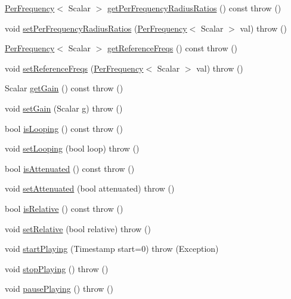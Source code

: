 \begin{DoxyCompactItemize}
\hyperlink{structAudio_1_1PerFrequency}{Per\+Frequency}$<$ Scalar $>$ \hyperlink{classAudio_1_1Source_a7af76debc465b08de34bcecb8e56a8b4}{get\+Per\+Frequency\+Radius\+Ratios} () const   throw ()
\item 
void \hyperlink{classAudio_1_1Source_ad6dd130e4af3ea5a7710928e0d542747}{set\+Per\+Frequency\+Radius\+Ratios} (\hyperlink{structAudio_1_1PerFrequency}{Per\+Frequency}$<$ Scalar $>$ val)  throw ()
\item 
\hyperlink{structAudio_1_1PerFrequency}{Per\+Frequency}$<$ Scalar $>$ \hyperlink{classAudio_1_1Source_a5358425f1485df421aa010b42b59f553}{get\+Reference\+Freqs} () const   throw ()
\item 
void \hyperlink{classAudio_1_1Source_a3455464edef39c958b987fe45ca78371}{set\+Reference\+Freqs} (\hyperlink{structAudio_1_1PerFrequency}{Per\+Frequency}$<$ Scalar $>$ val)  throw ()
\item 
Scalar \hyperlink{classAudio_1_1Source_adeaed3a4bbaaf6d60dd09e372d8e21e6}{get\+Gain} () const   throw ()
\item 
void \hyperlink{classAudio_1_1Source_a441db1be3a7072842e1a6643b65331d6}{set\+Gain} (Scalar g)  throw ()
\item 
bool \hyperlink{classAudio_1_1Source_aeafbb7052aea35fbfdbba9f81a4ebb2c}{is\+Looping} () const   throw ()
\item 
void \hyperlink{classAudio_1_1Source_a22dc52afab942aad5182511f6d669145}{set\+Looping} (bool loop)  throw ()
\item 
bool \hyperlink{classAudio_1_1Source_a62b43d5edb723e8297f5ad4878271175}{is\+Attenuated} () const   throw ()
\item 
void \hyperlink{classAudio_1_1Source_a55180fb909ec9950143b9b82e159a23a}{set\+Attenuated} (bool attenuated)  throw ()
\item 
bool \hyperlink{classAudio_1_1Source_a56cfa694bccbfac0a7adc232750ae3fe}{is\+Relative} () const   throw ()
\item 
void \hyperlink{classAudio_1_1Source_a99ae629edea3dcda748d56cc5a48b40c}{set\+Relative} (bool relative)  throw ()
\item 
void \hyperlink{classAudio_1_1Source_a4a6604d3195d16bdfc53b85a98c60f4d}{start\+Playing} (Timestamp start=0)  throw (\+Exception)
\item 
void \hyperlink{classAudio_1_1Source_a91de7bc95ce5c4cfc0d7050215829373}{stop\+Playing} ()  throw ()
\item 
void \hyperlink{classAudio_1_1Source_a06ed7c319ab1dd40bad9629f6065012d}{pause\+Playing} ()  throw ()

\end{DoxyCompactItemize}
